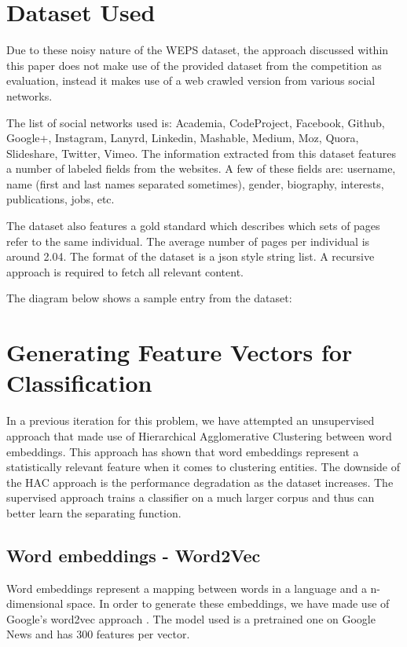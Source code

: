 \section{Dataset Used}
\label{section:dataset-used}
Due to these noisy nature of the WEPS dataset, the approach discussed within
this paper does not make use of the provided dataset from the competition as
evaluation, instead it makes use of a web crawled version from various social
networks.

The list of social networks used is: Academia, CodeProject, Facebook, Github,
Google+, Instagram, Lanyrd, Linkedin,  Mashable, Medium, Moz, Quora, Slideshare,
Twitter, Vimeo. The information extracted from this dataset features a number of
labeled fields from the websites. A few of these fields are: username, name
(first and last names separated sometimes), gender, biography, interests, publications,
jobs, etc. 

The dataset also features a gold standard which describes which sets of pages
refer to the same individual. The average number of pages per individual is
around 2.04. The format of the dataset is a json style string list. A recursive
approach is required to fetch all relevant content.

The diagram below shows a sample entry from the dataset:


\section{Generating Feature Vectors for Classification}
\label{section:generating-features}
In a previous iteration for this problem, we have attempted an unsupervised approach
that made use of Hierarchical Agglomerative Clustering between word embeddings.
This approach has shown that word embeddings represent a statistically relevant
feature when it comes to clustering entities. The downside of the HAC approach is the
performance degradation as the dataset increases. The supervised approach trains a
classifier on a much larger corpus and thus can better learn the separating function.

\subsection{Word embeddings - Word2Vec}
\label{sub-sec:word-embeddings}
Word embeddings represent a mapping between words in a language and a n-dimensional
space. In order to generate these embeddings, we have made use of Google's word2vec
approach \cite{mikolov2013distributed}. The model used is a pretrained one on
Google News and has 300 features per vector.

